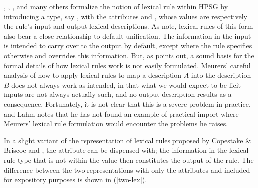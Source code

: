 \documentclass[output=paper
 	        ,biblatex
                ,babelshorthands
                ,newtxmath
                ,draftmode
                ,colorlinks, citecolor=brown
]{langscibook}
\begin{document}
\citet{CopestakeandBriscoe1991}, \citet{BriscoeandCopestake1999}, \citet{Meurers2001}, and many others formalize the notion of lexical rule within HPSG by introducing a type, say , with the attributes  and , whose values are respectively the rule's input and output lexical descriptions. As \citet{BriscoeandCopestake1999} note, lexical rules of this form also bear a close relationship to default unification.
The information in the input is intended to carry over to the output by default, except where the rule specifies otherwise and overrides this information. But, as \citet{Lahm2016} points out, a sound basis for the formal details of how lexical rules work is not easily formulated. Meurers' careful analysis of how to apply lexical rules to map a description $A$ into the description $B$ does not always work as intended, in that what we would expect to be licit inputs are not always actually such, and no output description results as a consequence. Fortunately,  it is not clear that this is a severe problem in practice, and Lahm notes that he has not found an example of practical import where Meurers' lexical rule formulation would encounter the problems he raises.

In a slight variant of the representation of lexical rules proposed by Copestake \& Briscoe and \citeauthor{Meurers2001}, the  attribute can be dispensed with; the information in the lexical rule type that is not within the  value then constitutes the output of the rule. The difference between the two representations with only the attributes  and  included for expository purposes is shown in (\ref{two-lex}).

\begin{exe}
\ex \label{two-lex}
\begin{xlist}
\ex \label{two-lex-a}
\ex \label{two-lex-b}
\end{xlist}
\end{exe}
\end{document}
